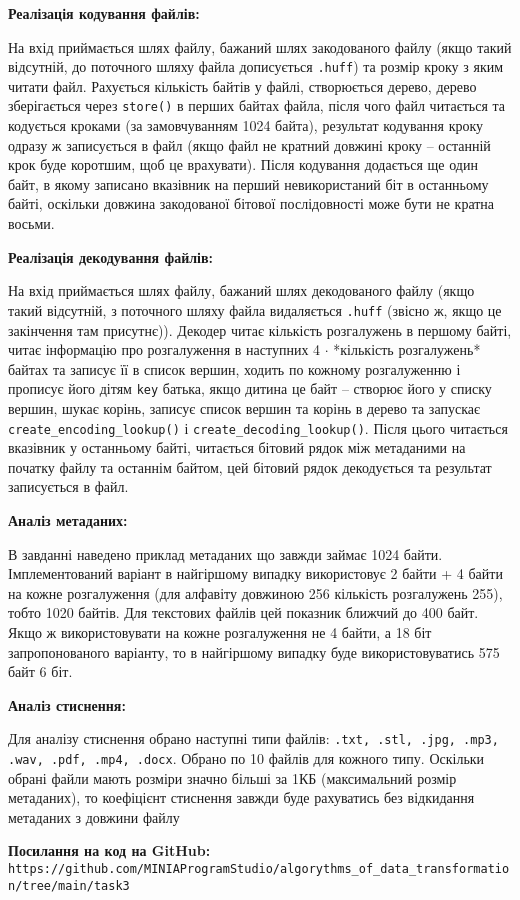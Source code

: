 \documentclass{article}
\def\code#1{\texttt{#1}}
\begin{document}
\textbf{Реалізація кодування файлів:}\\\indent

На вхід приймається шлях файлу, бажаний шлях закодованого файлу (якщо такий відсутній, до поточного шляху файла дописується \code{.huff}) та розмір кроку з яким читати файл. Рахується кількість байтів у файлі, створюється дерево, дерево зберігається через \code{store()} в перших байтах файла, після чого файл читається та кодується кроками (за замовчуванням 1024 байта), результат кодування кроку одразу ж записується в файл (якщо файл не кратний довжині кроку -- останній крок буде коротшим, щоб це врахувати). Після кодування додається ще один байт, в якому записано вказівник на перший невикористаний біт в останньому байті, оскільки довжина закодованої бітової послідовності може бути не кратна восьми.

\textbf{Реалізація декодування файлів:}\\\indent

На вхід приймається шлях файлу, бажаний шлях декодованого файлу (якщо такий відсутній, з поточного шляху файла видаляється \code{.huff} (звісно ж, якщо це закінчення там присутнє)). Декодер читає кількість розгалужень в першому байті, читає інформацію про розгалуження в наступних 4 $\cdot$ *кількість розгалужень* байтах та записує її в список вершин, ходить по кожному розгалуженню і прописує його дітям \code{key} батька, якщо дитина це байт -- створює його у списку вершин, шукає корінь, записує список вершин та корінь в дерево та запускає \code{create\_encoding\_lookup()} і \code{create\_decoding\_lookup()}. Після цього читається вказівник у останньому байті, читається бітовий рядок між метаданими на початку файлу та останнім байтом, цей бітовий рядок декодується та результат записується в файл.\\\indent

\newpage
\textbf{Аналіз метаданих:}\\\indent

В завданні наведено приклад метаданих що завжди займає 1024 байти. Імплементований варіант в найгіршому випадку використовує 2 байти + 4 байти на кожне розгалуження (для алфавіту довжиною 256 кількість розгалужень 255), тобто 1020 байтів. Для текстових файлів цей показник ближчий до 400 байт.\\\indent
Якщо ж використовувати на кожне розгалуження не 4 байти, а 18 біт запропонованого варіанту, то в найгіршому випадку буде використовуватись 575 байт 6 біт.\\\indent

\textbf{Аналіз стиснення:}\\\indent

Для аналізу стиснення обрано наступні типи файлів: \code{.txt, .stl, .jpg, .mp3, .wav, .pdf, .mp4, .docx}. Обрано по 10 файлів для кожного типу. Оскільки обрані файли мають розміри значно більші за 1КБ (максимальний розмір метаданих), то коефіцієнт стиснення завжди буде рахуватись без відкидання метаданих з довжини файлу


\textbf{Посилання на код на GitHub:}\\
\code{https://github.com/MINIAProgramStudio/algorythms\_of\_data\_transformation/tree/main/task3}
\end{document}
